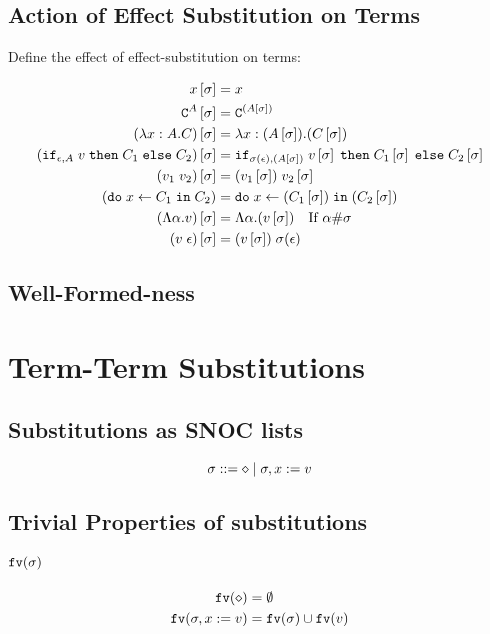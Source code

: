 {    \subsection{Action of Effect Substitution on Terms}

    Define the effect of effect-substitution on terms:

    \begin{align}
        x\ssi & = x \\
        \const{A}\ssi & = \const{(A\ssi)} \\
        (\lam{x}{A}{C})\ssi &= \lam{x}{(A\ssi)}{(C\ssi)}\\
        (\ifthenelse{\e}{A}{v}{C_1}{C_2})\ssi &= \ifthenelse{\si(\e)}{(A\ssi)}{v\ssi}{C_1\ssi}{C_2\ssi}\\
        (\apply{v_1}{v_2})\ssi&= \apply{(v_1\ssi)}{v_2\ssi}\\
        (\doin{x}{C_1}{C_2})&= \doin{x}{(C_1\ssi)}{(C_2\ssi)}\\
        (\elam{\a}{v})\ssi & = \elam{\a}{(v\ssi)}\qt{If $\a\#\si$}\\
        (\eapp{v}{\e})\ssi & = \eapp{(v\ssi)}{\si(\e)}\\
    \end{align}

    \subsection{Well-Formed-ness }

    \section{Term-Term Substitutions}
    \subsection{Substitutions as SNOC lists}

    \begin{equation}
       \si \gens \nil \mid \si, x \setto v
    \end{equation}

    \subsection{Trivial Properties of substitutions}
    \paragraph{$\fv{\si}$}
    \begin{align}
        \fv{\nil} &= \emptyset\\
        \fv{\si, x\setto v} &= \fv{\si}\cup\fv{v}
    \end{align}
}
